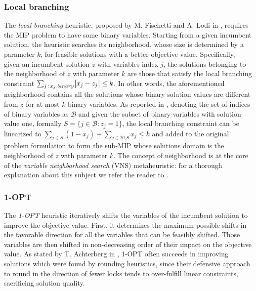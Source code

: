 \documentclass[a4paper,12pt,twoside]{scrbook}
\begin{document}
\subsubsection{Local branching}
The \textit{local branching} heuristic, proposed by M. Fischetti and A. Lodi in \cite{fischetti2003}, requires the MIP problem to have some binary variables. Starting from a given incumbent solution, the heuristic searches its neighborhood, whose size is determined by a parameter $k$, for feasible solutions with a better objective value. Specifically, given an incumbent solution $z$ with variables index $j$, the solutions belonging to the neighborhood of $z$ with parameter $k$ are those that satisfy the local branching constraint $\sum_{j \, : \, x_j \; binary}\abs{x_j - z_j} \leq k$. In other words, the aforementioned neighborhood contains all the solutions whose binary solution values are different from $z$ for at most $k$ binary variables. As reported in \cite{hendel2011}, denoting the set of indices of binary variables as $\mathcal{B}$ and given the subset of binary variables with solution value one, formally $S = \{j \in \mathcal{B} : z_j = 1\}$, the local branching constraint can be linearized to $\sum_{j \in S}(1 - x_j) + \sum_{j \in \mathcal{B} \setminus S}x_j \leq k$ and added to the original problem formulation to form the sub-MIP whose solutions domain is the neighborhood of $z$ with parameter $k$. The concept of neighborhood is at the core of the \textit{variable neighborhood search} (VNS) metaheuristic: for a thorough explanation about this subject we refer the reader to \cite{hansen2018}.
\subsubsection{1-OPT}
The \textit{1-OPT} heuristic iteratively shifts the variables of the incumbent solution to improve the objective value. First, it determines the maximum possible shifts in the favorable direction for all the variables that can be feasibly shifted. Those variables are then shifted in non-decreasing order of their impact on the objective value. As stated by T. Achterberg in \cite{achterberg2012}, 1-OPT often succeeds in improving solutions which were found by rounding heuristics, since their defensive approach to round in the direction of fewer locks tends to over-fulfill linear constraints, sacrificing solution quality. \par
\end{document}
